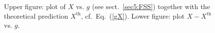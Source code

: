 \documentclass[12pt]{article}
\begin{document}
\begin{figure}
  \centering
\caption{Upper figure: plot of $X$
  vs. $g$ (see sect.~\ref{sec5:FSS}) together with the 
  theoretical prediction $X^{\text{th}}$, cf.~Eq.~(\ref{gX}).
Lower figure:  plot $X - X^{\text{th}}$ vs. $g$. }
  \label{fig:violets}
\end{figure}


\end{document}
